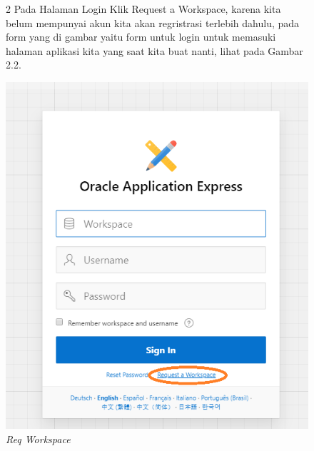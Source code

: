 \begin{itemize}
        
        \begin{figure}[!htbp]
        \item[2]Pada Halaman Login Klik Request a Workspace, karena kita belum mempunyai akun kita akan regristrasi terlebih dahulu, pada form yang di gambar yaitu form untuk login untuk memasuki halaman aplikasi kita yang saat kita buat nanti,  lihat pada Gambar 2.2.
        \begin{center}
        \includegraphics[scale=0.5]{figures/2.png}
        \caption{\textit{Req Workspace}}
        \end{center}
        \end{figure}
        

\end{itemize}
